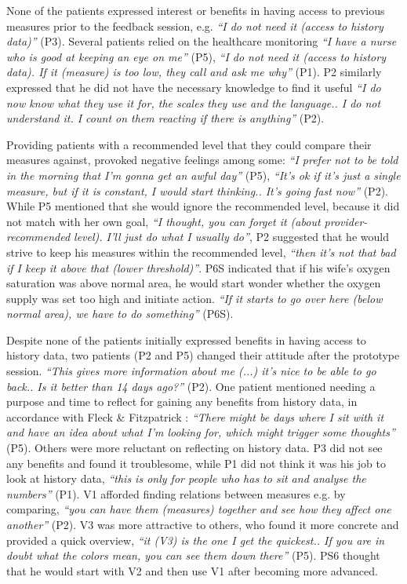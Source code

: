 None of the patients expressed interest or benefits in having access to previous measures prior to the feedback session, e.g. \textit{“I do not need it (access to history data)”} (P3). Several patients relied on the healthcare monitoring \textit{“I have a nurse who is good at keeping an eye on me”} (P5), \textit{“I do not need it (access to history data). If it (measure) is too low, they call and ask me why”} (P1). P2 similarly expressed that he did not have the necessary knowledge to find it useful \textit{“I do now know what they use it for, the scales they use and the language.. I do not understand it. I count on them reacting if there is anything”} (P2).

Providing patients with a recommended level that they could compare their measures against, provoked negative feelings among some: \textit{“I prefer not to be told in the morning that I’m gonna get an awful day”} (P5), \textit{“It’s ok if it’s just a single measure, but if it is constant, I would start thinking.. It’s going fast now”} (P2). While P5 mentioned that she would ignore the recommended level, because it did not match with her own goal, \textit{“I thought, you can forget it (about provider-recommended level). I’ll just do what I usually do”}, P2 suggested that he would strive to keep his measures within the recommended level, \textit{“then it’s not that bad if I keep it above that (lower threshold)”}. P6S indicated that if his wife’s oxygen saturation was above normal area, he would start wonder whether the oxygen supply was set too high and initiate action. \textit{“If it starts to go over here (below normal area), we have to do something”} (P6S).

Despite none of the patients initially expressed benefits in having access to history data, two patients (P2 and P5) changed their attitude after the prototype session. \textit{“This gives more information about me (...) it’s nice to be able to go back.. Is it better than 14 days ago?”} (P2). One patient mentioned needing a purpose and time to reflect for gaining any benefits from history data, in accordance with Fleck \& Fitzpatrick \cite{Fleck}: \textit{“There might be days where I sit with it and have an idea about what I’m looking for, which might trigger some thoughts”} (P5). Others were more reluctant on reflecting on history data. P3 did not see any benefits and found it troublesome, while P1 did not think it was his job to look at history data, \textit{“this is only for people who has to sit and analyse the numbers”} (P1). V1 afforded finding relations between measures e.g. by comparing, \textit{“you can have them (measures) together and see how they affect one another”} (P2). V3 was more attractive to others, who found it more concrete and provided a quick overview, \textit{“it (V3) is the one I get the quickest.. If you are in doubt what the colors mean, you can see them down there”} (P5). PS6 thought that he would start with V2 and then use V1 after becoming more advanced. 

